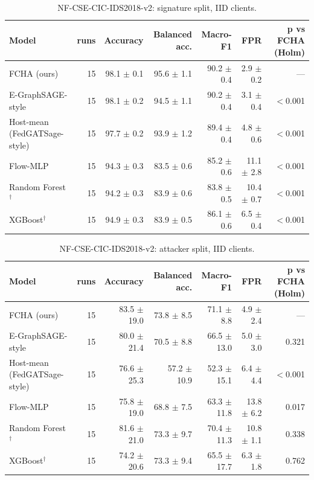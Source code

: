 \begin{table}[t]
\centering
\caption{NF-CSE-CIC-IDS2018-v2: signature split, IID clients.}
\label{tab:nf_cse_cic_ids2018_v2_signature}
\begin{tabular}{lrrrrrr}
\toprule
Model & runs & Accuracy & Balanced acc. & Macro-F1 & FPR & p vs FCHA (Holm) \\
\midrule
FCHA (ours) & 15 & 98.1 $\pm$ 0.1 & 95.6 $\pm$ 1.1 & 90.2 $\pm$ 0.4 & 2.9 $\pm$ 0.2 & — \\
E-GraphSAGE-style & 15 & 98.1 $\pm$ 0.2 & 94.5 $\pm$ 1.1 & 90.2 $\pm$ 0.4 & 3.1 $\pm$ 0.4 & $<$0.001 \\
Host-mean (FedGATSage-style) & 15 & 97.7 $\pm$ 0.2 & 93.9 $\pm$ 1.2 & 89.4 $\pm$ 0.4 & 4.8 $\pm$ 0.6 & $<$0.001 \\
Flow-MLP & 15 & 94.3 $\pm$ 0.3 & 83.5 $\pm$ 0.6 & 85.2 $\pm$ 0.6 & 11.1 $\pm$ 2.8 & $<$0.001 \\
Random Forest$^\dagger$ & 15 & 94.2 $\pm$ 0.3 & 83.9 $\pm$ 0.6 & 83.8 $\pm$ 0.5 & 10.4 $\pm$ 0.7 & $<$0.001 \\
XGBoost$^\dagger$ & 15 & 94.9 $\pm$ 0.3 & 83.9 $\pm$ 0.5 & 86.1 $\pm$ 0.6 & 6.5 $\pm$ 0.4 & $<$0.001 \\
\bottomrule
\end{tabular}
\end{table}

\begin{table}[t]
\centering
\caption{NF-CSE-CIC-IDS2018-v2: attacker split, IID clients.}
\label{tab:nf_cse_cic_ids2018_v2_attacker}
\begin{tabular}{lrrrrrr}
\toprule
Model & runs & Accuracy & Balanced acc. & Macro-F1 & FPR & p vs FCHA (Holm) \\
\midrule
FCHA (ours) & 15 & 83.5 $\pm$ 19.0 & 73.8 $\pm$ 8.5 & 71.1 $\pm$ 8.8 & 4.9 $\pm$ 2.4 & — \\
E-GraphSAGE-style & 15 & 80.0 $\pm$ 21.4 & 70.5 $\pm$ 8.8 & 66.5 $\pm$ 13.0 & 5.0 $\pm$ 3.0 & 0.321 \\
Host-mean (FedGATSage-style) & 15 & 76.6 $\pm$ 25.3 & 57.2 $\pm$ 10.9 & 52.3 $\pm$ 15.1 & 6.4 $\pm$ 4.4 & $<$0.001 \\
Flow-MLP & 15 & 75.8 $\pm$ 19.0 & 68.8 $\pm$ 7.5 & 63.3 $\pm$ 11.8 & 13.8 $\pm$ 6.2 & 0.017 \\
Random Forest$^\dagger$ & 15 & 81.6 $\pm$ 21.0 & 73.3 $\pm$ 9.7 & 70.4 $\pm$ 11.3 & 10.8 $\pm$ 1.1 & 0.338 \\
XGBoost$^\dagger$ & 15 & 74.2 $\pm$ 20.6 & 73.3 $\pm$ 9.4 & 65.5 $\pm$ 17.7 & 6.3 $\pm$ 1.8 & 0.762 \\
\bottomrule
\end{tabular}
\end{table}

